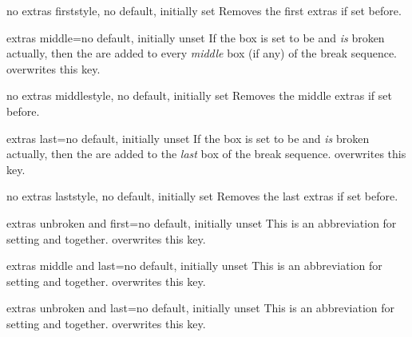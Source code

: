 \begin{docTcbKey}[][doc new=2015-07-16]{no extras first}{}{style, no default, initially set}
  Removes the first extras if set before.
\end{docTcbKey}

\begin{docTcbKey}[][doc new=2015-07-16]{extras middle}{=}{no default, initially unset}
  If the box is set to be  and \emph{is} broken actually,
  then the  are added to every \emph{middle} box (if any) of the break sequence.
   overwrites this key.
\end{docTcbKey}

\begin{docTcbKey}[][doc new=2015-07-16]{no extras middle}{}{style, no default, initially set}
  Removes the middle extras if set before.
\end{docTcbKey}

\begin{docTcbKey}[][doc new=2015-07-16]{extras last}{=}{no default, initially unset}
  If the box is set to be  and \emph{is} broken actually,
  then the  are added to the \emph{last} box of the break sequence.
   overwrites this key.
\end{docTcbKey}

\begin{docTcbKey}[][doc new=2015-07-16]{no extras last}{}{style, no default, initially set}
  Removes the last extras if set before.
\end{docTcbKey}

\begin{docTcbKey}[][doc new=2015-07-16]{extras unbroken and first}{=}{no default, initially unset}
  This is an abbreviation for setting
   and
   together.
   overwrites this key.
\end{docTcbKey}

\begin{docTcbKey}[][doc new=2015-07-16]{extras middle and last}{=}{no default, initially unset}
  This is an abbreviation for setting
   and
   together.
   overwrites this key.
\end{docTcbKey}

\enlargethispage*{1cm}
\begin{docTcbKey}[][doc new=2015-07-16]{extras unbroken and last}{=}{no default, initially unset}
  This is an abbreviation for setting
   and
   together.
   overwrites this key.
\end{docTcbKey}



